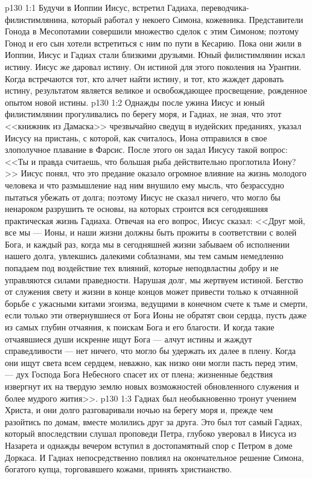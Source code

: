 \vs p130 1:1 Будучи в Иоппии Иисус, встретил Гадиаха, переводчика\hyp{}филистимлянина, который работал у некоего Симона, кожевника. Представители Гонода в Месопотамии совершили множество сделок с этим Симоном; поэтому Гонод и его сын хотели встретиться с ним по пути в Кесарию. Пока они жили в Иоппии, Иисус и Гадиах стали близкими друзьями. Юный филистимлянин искал истину. Иисус же даровал истину. Он  истиной для этого поколения на Урантии. Когда встречаются тот, кто алчет найти истину, и тот, кто жаждет даровать истину, результатом является великое и освобождающее просвещение, рожденное опытом новой истины.
\vs p130 1:2 Однажды после ужина Иисус и юный филистимлянин прогуливались по берегу моря, и Гадиах, не зная, что этот <<книжник из Дамаска>> чрезвычайно сведущ в иудейских преданиях, указал Иисусу на пристань, с которой, как считалось, Иона отправился в свое злополучное плавание в Фарсис. После этого он задал Иисусу такой вопрос: <<Ты и правда считаешь, что большая рыба действительно проглотила Иону?>> Иисус понял, что это предание оказало огромное влияние на жизнь молодого человека и что размышление над ним внушило ему мысль, что безрассудно пытаться убежать от долга; поэтому Иисус не сказал ничего, что могло бы ненароком разрушить те основы, на которых строится вся сегодняшняя практическая жизнь Гадиаха. Отвечая на его вопрос, Иисус сказал: <<Друг мой, все мы --- Ионы, и наши жизни должны быть прожиты в соответствии с волей Бога, и каждый раз, когда мы в сегодняшней жизни забываем об исполнении нашего долга, увлекшись далекими соблазнами, мы тем самым немедленно попадаем под воздействие тех влияний, которые неподвластны добру и не управляются силами праведности. Нарушая долг, мы жертвуем истиной. Бегство от служения свету и жизни в конце концов может привести только к отчаянной борьбе с ужасными китами эгоизма, ведущими в конечном счете к тьме и смерти, если только эти отвернувшиеся от Бога Ионы не обратят свои сердца, пусть даже из самых глубин отчаяния, к поискам Бога и его благости. И когда такие отчаявшиеся души искренне ищут Бога --- алчут истины и жаждут справедливости --- нет ничего, что могло бы удержать их далее в плену. Когда они ищут света всем сердцем, неважно, как низко они могли пасть перед этим, --- дух Господа Бога Небесного спасет их от плена; жизненные бедствия извергнут их на твердую землю новых возможностей обновленного служения и более мудрого жития>>.
\vs p130 1:3 Гадиах был необыкновенно тронут учением Христа, и они долго разговаривали ночью на берегу моря и, прежде чем разойтись по домам, вместе молились друг за друга. Это был тот самый Гадиах, который впоследствии слушал проповеди Петра, глубоко уверовал в Иисуса из Назарета и однажды вечером вступил в достопамятный спор с Петром в доме Доркаса. И Гадиах непосредственно повлиял на окончательное решение Симона, богатого купца, торговавшего кожами, принять христианство.
